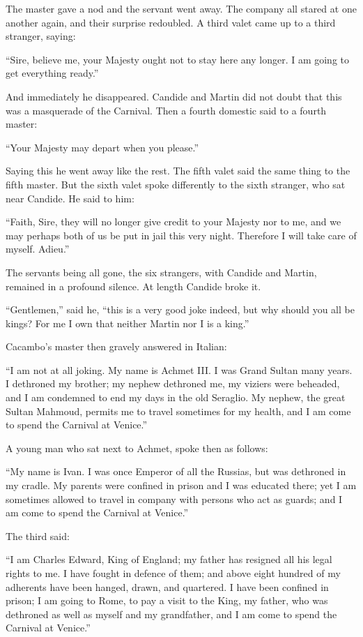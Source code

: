 The master gave a nod and the servant went away. The company all stared at one another again, and their surprise redoubled. A third valet came up to a third stranger, saying:

``Sire, believe me, your Majesty ought not to stay here any longer. I am going to get everything ready.''

And immediately he disappeared. Candide and Martin did not doubt that this was a masquerade of the Carnival. Then a fourth domestic said to a fourth master:

``Your Majesty may depart when you please.''

Saying this he went away like the rest. The fifth valet said the same thing to the fifth master. But the sixth valet spoke differently to the sixth stranger, who sat near Candide. He said to him:

``Faith, Sire, they will no longer give credit to your Majesty nor to me, and we may perhaps both of us be put in jail this very night. Therefore I will take care of myself. Adieu.''

The servants being all gone, the six strangers, with Candide and Martin, remained in a profound silence. At length Candide broke it.

``Gentlemen,'' said he, ``this is a very good joke indeed, but why should you all be kings? For me I own that neither Martin nor I is a king.''

Cacambo's master then gravely answered in Italian:

``I am not at all joking. My name is Achmet III. I was Grand Sultan many years. I dethroned my brother; my nephew dethroned me, my viziers were beheaded, and I am condemned to end my days in the old Seraglio. My nephew, the great Sultan Mahmoud, permits me to travel sometimes for my health, and I am come to spend the Carnival at Venice.''

A young man who sat next to Achmet, spoke then as follows:

``My name is Ivan. I was once Emperor of all the Russias, but was dethroned in my cradle. My parents were confined in prison and I was educated there; yet I am sometimes allowed to travel in company with persons who act as guards; and I am come to spend the Carnival at Venice.''

The third said:

``I am Charles Edward, King of England; my father has resigned all his legal rights to me. I have fought in defence of them; and above eight hundred of my adherents have been hanged, drawn, and quartered. I have been confined in prison; I am going to Rome, to pay a visit to the King, my father, who was dethroned as well as myself and my grandfather, and I am come to spend the Carnival at Venice.''

